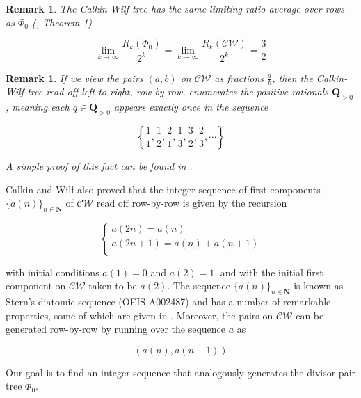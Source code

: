 \documentclass{article}
\newtheorem{remark}[theorem]{Remark}  %
\begin{document}
\begin{remark}
The Calkin-Wilf tree has the same limiting ratio average over rows as $\Phi_0$ (\cite{CW_means}, Theorem 1)

$$\lim_{k \rightarrow \infty} \frac{R_k(\Phi_0)}{2^k} = \lim_{k \rightarrow \infty} \frac{R_k(\mathcal{CW})}{2^k} = \frac{3}{2}$$
\end{remark}

\begin{remark}\label{calkinwilfrationals}
If we view the pairs $(a, b)$ on $\mathcal{CW}$ as fractions $\frac{a}{b}$, then the Calkin-Wilf tree read-off left to right, row by row, enumerates the positive rationals $\mathbf{Q}_{>0}$, meaning each $q \in \mathbf{Q}_{>0}$ appears exactly once in the sequence

$$\left\{ \frac{1}{1}, \frac{1}{2}, \frac{2}{1}, \frac{1}{3}, \frac{3}{2}, \frac{2}{3}, \cdots \right\}$$

A simple proof of this fact can be found in \cite{CW}.
\end{remark}

Calkin and Wilf also proved that the integer sequence of first components $\{ a(n) \}_{n \in \mathbf{N}}$ of $\mathcal{CW}$ read off row-by-row is given by the recursion 

$$\begin{cases}
a(2n) = a(n) \\
a(2n+1) = a(n) + a(n+1) \\
\end{cases}$$

with initial conditions $a(1) = 0$ and $a(2) = 1$, and with the initial first component on $\mathcal{CW}$ taken to be $a(2)$. The sequence $\{ a(n) \}_{n \in \mathbf{N}}$ is known as Stern's diatomic sequence (OEIS A002487) and has a number of remarkable properties, some of which are given in \cite{CW}. Moreover, the pairs on $\mathcal{CW}$ can be generated row-by-row by running over the sequence $a$ as

$$\left(a(n), a(n+1)\right)$$

Our goal is to find an integer sequence that  analogously generates the divisor pair tree $\Phi_0$.
\end{document}
